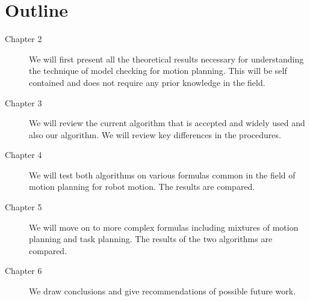 \section{Outline}
\begin{description}
    \item[Chapter 2] We will first present all the theoretical results necessary for understanding the technique of model checking for motion planning. This will be self contained and does not require any prior knowledge in the field.
    \item[Chapter 3] We will review the current algorithm that is accepted and widely used and also our algorithm. We will review key differences in the procedures.
    \item[Chapter 4] We will test both algorithms on various formulas common in the field of motion planning for robot motion. The results are compared. %
    \item[Chapter 5] We will move on to more complex formulas including mixtures of motion planning and task planning. The results of the two algorithms are compared. 
    \item[Chapter 6] We draw conclusions and give recommendations of possible future work.
\end{description}

